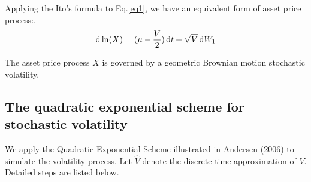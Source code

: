 \documentclass{ws-ijfe}
\begin{document}

Applying the Ito's formula to Eq.\eqref{eq1}, we have an equivalent form of asset price process:.
\begin{equation}\label{logX}
  \d\ln(X)=(\mu-\frac{V}{2})\,\d t+\sqrt{V}\,\d W_1
\end{equation}

The asset price process $X$ is governed by a geometric Brownian motion stochastic volatility.

\subsection{The quadratic exponential scheme for stochastic volatility}\label{se:QE}
We apply the Quadratic Exponential Scheme illustrated in Andersen (2006) \cite{Andersen} to simulate the volatility process. Let $\hat{V}$ denote the discrete-time approximation of $V$. Detailed steps are listed below.
\end{document}
